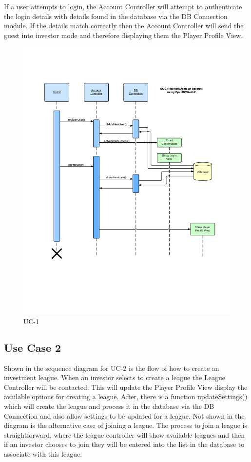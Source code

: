 If a user attempts to login, the Account Controller will attempt to authenticate
the login details with details found in the database via the DB Connection
module. If the details match correctly then the Account Controller will send the
guest into investor mode and therefore displaying them the Player Profile View.

\begin{figure}[H]
\centering
\includegraphics[width=5.5in]{./img/inter/uc1.jpg}
\caption{UC-1}
\end{figure}

\subsection{Use Case 2}
Shown in the sequence diagram for UC-2 is the flow of how to create an
investment league. When an investor selects to create a league the League
Controller will be contacted. This will update the Player Profile View display
the available options for creating a league. After, there is a function
updateSettings() which will create the league and process it in the database
via the DB Connection and also allow settings to be updated for a league. Not
shown in the diagram is the alternative case of joining a league. The process
to join a league is straightforward, where the league controller will show
available leagues and then if an investor chooses to join they will be entered
into the list in the database to associate with this league.

